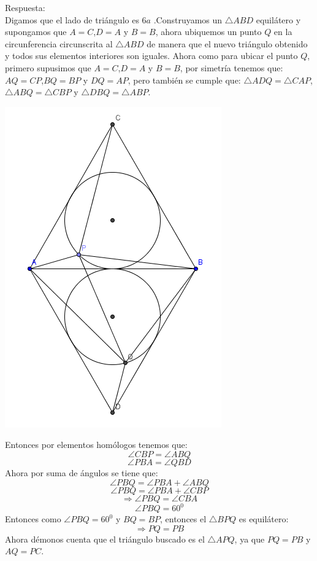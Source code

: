 \documentclass{book}
\begin{document}
\begin{enumerate}
          Respuesta:\\
          Digamos que el lado de triángulo es $6a$ .Construyamos un $\triangle ABD$ equilátero y supongamos que $A=C$,$D=A$ y $B=B$, ahora ubiquemos un punto $Q$ en la circunferencia circunscrita al $\triangle ABD$ de manera que el nuevo triángulo obtenido y todos sus elementos interiores son iguales.
          Ahora como para ubicar el punto $Q$, primero supusimos que $A=C$,$D=A$ y $B=B$, por simetría tenemos que: $AQ=CP$,$BQ=BP$ y $DQ=AP$, pero también se cumple que: $\triangle ADQ=\triangle CAP$,$\triangle ABQ=\triangle CBP$ y $\triangle DBQ=\triangle ABP$.
          \begin{center}
              \includegraphics[scale=1]{imagenes/Geometria/24,1.png}
          \end{center}
          Entonces por elementos homólogos tenemos que:
          $$\angle CBP=\angle ABQ$$
          $$\angle PBA=\angle QBD$$
          Ahora por suma de ángulos se tiene que:
          $$\angle PBQ=\angle PBA+\angle ABQ$$
          $$\angle PBQ=\angle PBA+\angle CBP$$
          $$\Rightarrow\angle PBQ=\angle CBA$$
          $$\angle PBQ=60^0$$
          Entonces como $\angle PBQ=60^0$ y $BQ=BP$, entonces el $\triangle BPQ$ es equilátero:
          $$\Rightarrow PQ=PB$$
          Ahora démonos cuenta que el triángulo buscado es el $\triangle APQ$, ya que $PQ=PB$ y $AQ=PC$.\\

\end{enumerate}
\end{document}
